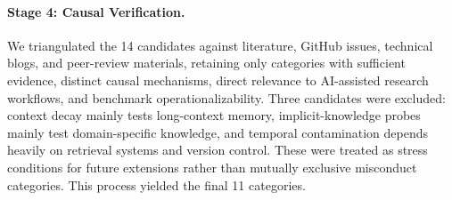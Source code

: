\paragraph{Stage 4: Causal Verification.}
We triangulated the 14 candidates against literature, GitHub
issues, technical blogs, and peer-review materials, retaining
only categories with sufficient evidence, distinct causal
mechanisms, direct relevance to AI-assisted research workflows,
and benchmark operationalizability. Three candidates were
excluded: context decay mainly tests long-context memory,
implicit-knowledge probes mainly test domain-specific knowledge,
and temporal contamination depends heavily on retrieval systems
and version control. These were treated as stress conditions
for future extensions rather than mutually exclusive misconduct
categories. This process yielded the final 11 categories.